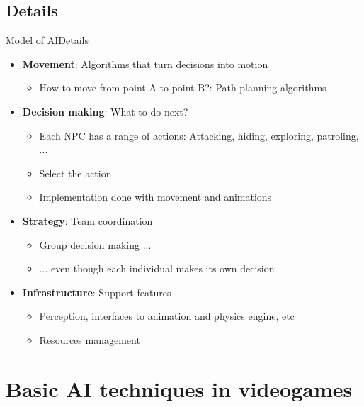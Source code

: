 \documentclass[10pt,compress]{beamer} %
\begin{document}
\subsection{Details}
\begin{frame}{Model of AI}{Details}
	\begin{itemize}
	\item \textbf{Movement}: Algorithms that turn decisions into motion
	\begin{itemize}
		\item How to move from point A to point B?: Path-planning algorithms
	\end{itemize}
	\item \textbf{Decision making}: What to do next?
	\begin{itemize}
		\item Each NPC has a range of actions: Attacking, hiding, exploring, patroling, ...
		\item Select the action
		\item Implementation done with movement and animations
	\end{itemize}
	\item \textbf{Strategy}: Team coordination
	\begin{itemize}
		\item Group decision making ...
		\item ... even though each individual makes its own decision
	\end{itemize}
	\item \textbf{Infrastructure}: Support features
	\begin{itemize}
		\item Perception, interfaces to animation and physics engine, etc
		\item Resources management
	\end{itemize}
	\end{itemize}
\end{frame}

\section{Basic AI techniques in videogames}
\end{document}
